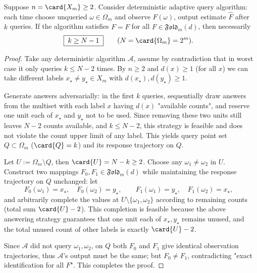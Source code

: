 \begin{theorem}\label{thm:pom-microcanonical-fold-worstcase-query-rigidity}
Suppose \(n=\card{X_m}\ge 2\).
Consider deterministic adaptive query algorithm: each time choose unqueried \(\omega\in\Omega_m\) and observe \(F(\omega)\), output estimate \(\widehat F\) after \(k\) queries.
If the algorithm satisfies \(\widehat F=F\) for all \(F\in\mathfrak{Fold}_m(d)\), then necessarily
\[
\boxed{\;k\ge N-1\;}
\qquad(N=\card{\Omega_m}=2^m).
\]
\end{theorem}
\begin{proof}
Take any deterministic algorithm \(\mathcal{A}\), assume by contradiction that in worst case it only queries \(k\le N-2\) times.
By \(n\ge 2\) and \(d(x)\ge 1\) (for all \(x\)) we can take different labels \(x_\star\neq y_\star\in X_m\) with \(d(x_\star),d(y_\star)\ge 1\).
\par
Generate answers adversarially: in the first \(k\) queries, sequentially draw answers from the multiset with each label \(x\) having \(d(x)\) "available counts", and reserve one unit each of \(x_\star\) and \(y_\star\) not to be used.
Since removing these two units still leaves \(N-2\) counts available, and \(k\le N-2\), this strategy is feasible and does not violate the count upper limit of any label.
This yields query point set \(Q\subset\Omega_m\) (\(\card{Q}=k\)) and its response trajectory on \(Q\).
\par
Let \(U:=\Omega_m\setminus Q\), then \(\card{U}=N-k\ge 2\).
Choose any \(\omega_1\neq\omega_2\) in \(U\).
Construct two mappings \(F_0,F_1\in\mathfrak{Fold}_m(d)\) while maintaining the response trajectory on \(Q\) unchanged:
let
\[
F_0(\omega_1)=x_\star,\quad F_0(\omega_2)=y_\star,\qquad
F_1(\omega_1)=y_\star,\quad F_1(\omega_2)=x_\star,
\]
and arbitrarily complete the values at \(U\setminus\{\omega_1,\omega_2\}\) according to remaining counts (total sum \(\card{U}-2\)).
This completion is feasible because the above answering strategy guarantees that one unit each of \(x_\star,y_\star\) remains unused, and the total unused count of other labels is exactly \(\card{U}-2\).
\par
Since \(\mathcal{A}\) did not query \(\omega_1,\omega_2\), on \(Q\) both \(F_0\) and \(F_1\) give identical observation trajectories, thus \(\mathcal{A}\)'s output must be the same;
but \(F_0\neq F_1\), contradicting "exact identification for all \(F\)". This completes the proof.
\end{proof}

